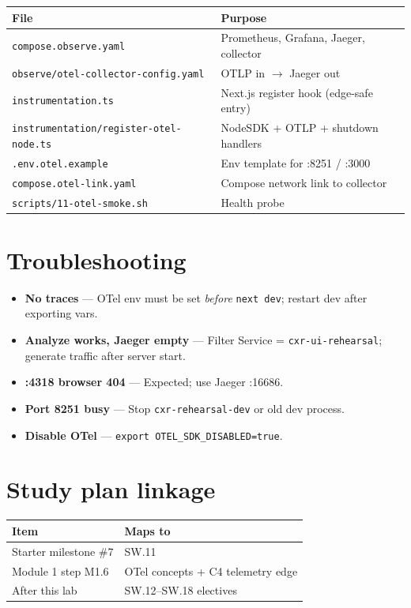 \documentclass[11pt,a4paper]{report}
\begin{document}
\begin{longtable}{@{}p{4.4cm}p{8.6cm}@{}}
\toprule
File & Purpose \\
\midrule
\endhead
\texttt{compose.observe.yaml} & Prometheus, Grafana, Jaeger, collector \\
\texttt{observe/otel-collector-config.yaml} & OTLP in $\rightarrow$ Jaeger out \\
\texttt{instrumentation.ts} & Next.js register hook (edge-safe entry) \\
\texttt{instrumentation/register-otel-node.ts} & NodeSDK + OTLP + shutdown handlers \\
\texttt{.env.otel.example} & Env template for :8251 / :3000 \\
\texttt{compose.otel-link.yaml} & Compose network link to collector \\
\texttt{scripts/11-otel-smoke.sh} & Health probe \\
\bottomrule
\end{longtable}

\chapter{Troubleshooting}

\begin{itemize}
  \item \textbf{No traces} --- OTel env must be set \emph{before} \texttt{next dev}; restart dev after exporting vars.
  \item \textbf{Analyze works, Jaeger empty} --- Filter Service = \texttt{cxr-ui-rehearsal}; generate traffic after server start.
  \item \textbf{:4318 browser 404} --- Expected; use Jaeger :16686.
  \item \textbf{Port 8251 busy} --- Stop \texttt{cxr-rehearsal-dev} or old dev process.
  \item \textbf{Disable OTel} --- \texttt{export OTEL\_SDK\_DISABLED=true}.
\end{itemize}

\chapter{Study plan linkage}

\begin{center}
\begin{tabular}{ll}
\toprule
Item & Maps to \\
\midrule
Starter milestone \#7 & SW.11 \\
Module 1 step M1.6 & OTel concepts + C4 telemetry edge \\
After this lab & SW.12--SW.18 electives \\
\bottomrule
\end{tabular}
\end{center}
\end{document}
